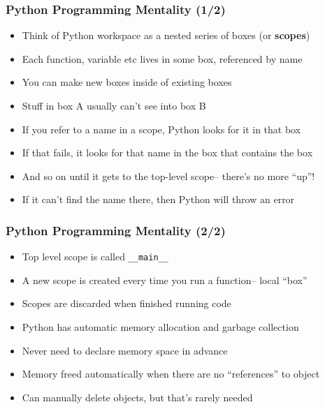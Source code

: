 \documentclass[aspectratio=169, handout]{beamer}
\begin{document}
\begin{frame}
\frametitle{Python Programming Mentality (1/2)}

\begin{itemize}
	\item Think of Python workspace as a nested series of boxes (or \textbf{scopes})
	
	\item Each function, variable etc lives in some box, referenced by name
	
	\item <2->You can make new boxes inside of existing boxes
	
	\item <2->Stuff in box A usually can't see into box B
	
	\item <3->If you refer to a name in a scope, Python looks for it in that box
	
	\item <3->If that fails, it looks for that name in the box that contains the box
	
	\item <4->And so on until it gets to the top-level scope-- there's no more ``up''!
	
	\item <4->If it can't find the name there, then Python will throw an error
\end{itemize}
\end{frame}


\begin{frame}
\frametitle{Python Programming Mentality (2/2)}

\begin{itemize}
	\item Top level scope is called \texttt{\_\_main\_\_}
	
	\item A new scope is created every time you run a function-- local ``box''
	
	\item Scopes are discarded when finished running code
	
	\item <2->Python has automatic memory allocation and garbage collection
	
	\item <2->Never need to declare memory space in advance
	
	\item <3->Memory freed automatically when there are no ``references'' to object
	
	\item <3->Can manually delete objects, but that's rarely needed
\end{itemize}

\end{frame}
\end{document}
